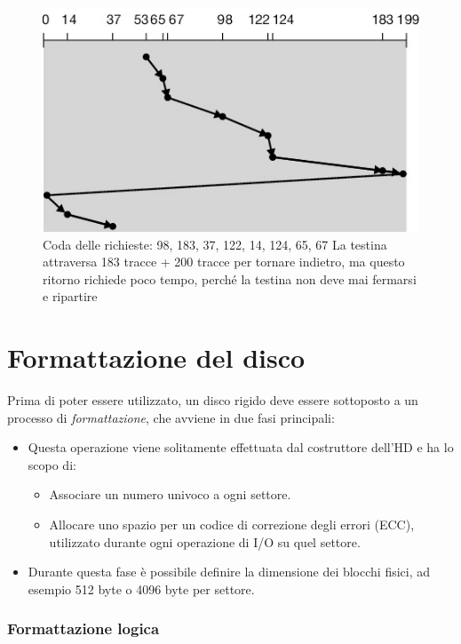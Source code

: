 \begin{figure}[h] \centering \includegraphics[width=0.25\linewidth]{images/scheduling_hdd_cscan.png}
    \caption{Coda delle richieste: 98, 183, 37, 122, 14, 124, 65, 67 La testina attraversa 183 tracce + 200 tracce per tornare indietro, ma questo ritorno richiede poco tempo, perché la
    testina non deve mai fermarsi e ripartire}
\end{figure}



\section{Formattazione del disco}
Prima di poter essere utilizzato, un disco rigido deve essere sottoposto a un processo di \textit{formattazione}, che avviene in due fasi principali:

\begin{itemize}
    \item Questa operazione viene solitamente effettuata dal costruttore dell’HD e ha lo scopo di:
    \begin{itemize}
        \item Associare un numero univoco a ogni settore.
        \item Allocare uno spazio per un codice di correzione degli errori (ECC), utilizzato durante ogni operazione di I/O su quel settore.
    \end{itemize}
    \item Durante questa fase è possibile definire la dimensione dei blocchi fisici, ad esempio 512 byte o 4096 byte per settore.
\end{itemize}

\subsubsection{Formattazione logica}

